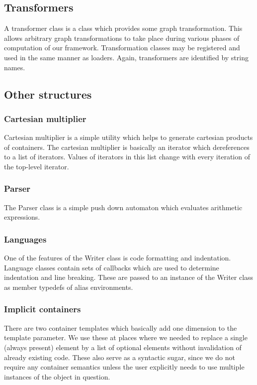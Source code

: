 \subsection*{Transformers}
  A transformer class is a class which provides some graph transformation. This allows arbitrary graph transformations to take place during various phases of computation of our framework. Transformation classes may be registered and used in the same manner as loaders. Again, transformers are identified by string names.

\subsection*{Other structures}

\subsubsection{Cartesian multiplier}
   Cartesian multiplier is a simple utility which helps to generate cartesian products of containers. The cartesian multiplier is basically an iterator which dereferences to a list of iterators. Values of iterators in this list change with every iteration of the top-level iterator.

\subsubsection{Parser}
  The Parser class is a simple push down automaton which evaluates arithmetic expressions. 

\subsubsection{Languages}
  One of the features of the Writer class is code formatting and indentation. Language classes contain sets of callbacks which are used to determine indentation and line breaking. These are passed to an instance of the Writer class as member typedefs of alias environments.

\subsubsection{Implicit containers}
  There are two container templates which basically add one dimension to the template parameter. We use these at places where we needed to replace a single (always present) element by a list of optional elements without invalidation of already existing code. These also serve as a syntactic sugar, since we do not require any container semantics unless the user explicitly needs to use multiple instances of the object in question.

